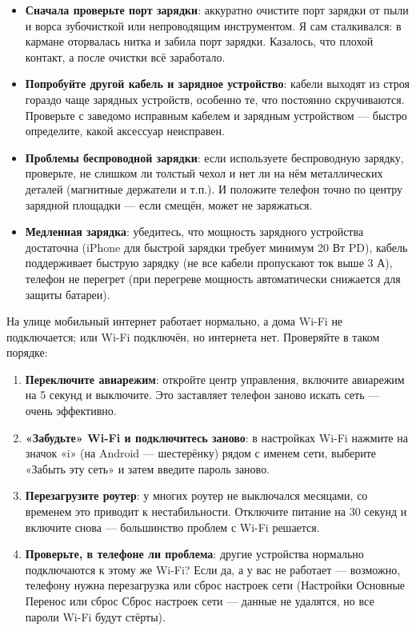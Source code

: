 \begin{itemize}
  \item \textbf{Сначала проверьте порт зарядки}: аккуратно очистите порт зарядки от пыли и ворса зубочисткой или непроводящим инструментом. Я сам сталкивался: в кармане оторвалась нитка и забила порт зарядки. Казалось, что плохой контакт, а после очистки всё заработало.
  \item \textbf{Попробуйте другой кабель и зарядное устройство}: кабели выходят из строя гораздо чаще зарядных устройств, особенно те, что постоянно скручиваются. Проверьте с заведомо исправным кабелем и зарядным устройством — быстро определите, какой аксессуар неисправен.
  \item \textbf{Проблемы беспроводной зарядки}: если используете беспроводную зарядку, проверьте, не слишком ли толстый чехол и нет ли на нём металлических деталей (магнитные держатели и т.п.). И положите телефон точно по центру зарядной площадки — если смещён, может не заряжаться.
  \item \textbf{Медленная зарядка}: убедитесь, что мощность зарядного устройства достаточна (iPhone для быстрой зарядки требует минимум 20 Вт PD), кабель поддерживает быструю зарядку (не все кабели пропускают ток выше 3 А), телефон не перегрет (при перегреве мощность автоматически снижается для защиты батареи).
\end{itemize}


На улице мобильный интернет работает нормально, а дома Wi-Fi не подключается; или Wi-Fi подключён, но интернета нет. Проверяйте в таком порядке:

\begin{enumerate}
  \item \textbf{Переключите авиарежим}: откройте центр управления, включите авиарежим на 5 секунд и выключите. Это заставляет телефон заново искать сеть — очень эффективно.
  \item \textbf{«Забудьте» Wi-Fi и подключитесь заново}: в настройках Wi-Fi нажмите на значок «i» (на Android — шестерёнку) рядом с именем сети, выберите «Забыть эту сеть» и затем введите пароль заново.
  \item \textbf{Перезагрузите роутер}: у многих роутер не выключался месяцами, со временем это приводит к нестабильности. Отключите питание на 30 секунд и включите снова — большинство проблем с Wi-Fi решается.
  \item \textbf{Проверьте, в телефоне ли проблема}: другие устройства нормально подключаются к этому же Wi-Fi? Если да, а у вас не работает — возможно, телефону нужна перезагрузка или сброс настроек сети (Настройки Основные Перенос или сброс Сброс настроек сети — данные не удалятся, но все пароли Wi-Fi будут стёрты).
\end{enumerate}

